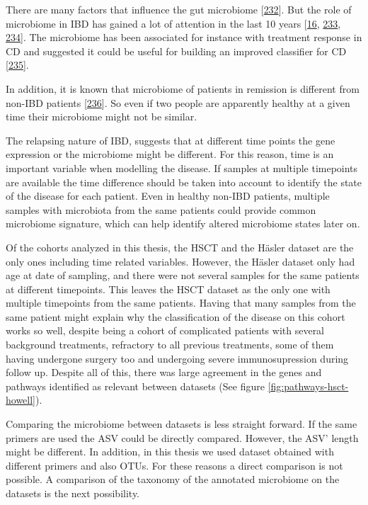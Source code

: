 \documentclass[
  12pt,
  a4paper,
  twoside,
  openright]{book}
\begin{document}
There are many factors that influence the gut microbiome {[}\protect\hyperlink{ref-hasan2019}{232}{]}.
But the role of microbiome in IBD has gained a lot of attention in the last 10 years {[}\protect\hyperlink{ref-khanna2014}{16}, \protect\hyperlink{ref-bringiotti2014}{233}, \protect\hyperlink{ref-lloyd-price2019}{234}{]}.
The microbiome has been associated for instance with treatment response in CD and suggested it could be useful for building an improved classifier for CD {[}\protect\hyperlink{ref-douglas2018}{235}{]}.

In addition, it is known that microbiome of patients in remission is different from non-IBD patients {[}\protect\hyperlink{ref-halfvarson2017}{236}{]}.
So even if two people are apparently healthy at a given time their microbiome might not be similar.

The relapsing nature of IBD, suggests that at different time points the gene expression or the microbiome might be different.
For this reason, time is an important variable when modelling the disease.
If samples at multiple timepoints are available the time difference should be taken into account to identify the state of the disease for each patient.
Even in healthy non-IBD patients, multiple samples with microbiota from the same patients could provide common microbiome signature, which can help identify altered microbiome states later on.

Of the cohorts analyzed in this thesis, the HSCT and the Häsler dataset are the only ones including time related variables.
However, the Häsler dataset only had age at date of sampling, and there were not several samples for the same patients at different timepoints.
This leaves the HSCT dataset as the only one with multiple timepoints from the same patients.
Having that many samples from the same patient might explain why the classification of the disease on this cohort works so well, despite being a cohort of complicated patients with several background treatments, refractory to all previous treatments, some of them having undergone surgery too and undergoing severe immunosupression during follow up.
Despite all of this, there was large agreement in the genes and pathways identified as relevant between datasets (See figure \ref{fig:pathways-hsct-howell}).

Comparing the microbiome between datasets is less straight forward.
If the same primers are used the ASV could be directly compared.
However, the ASV' length might be different.
In addition, in this thesis we used dataset obtained with different primers and also OTUs.
For these reasons a direct comparison is not possible.
A comparison of the taxonomy of the annotated microbiome on the datasets is the next possibility.
\end{document}
